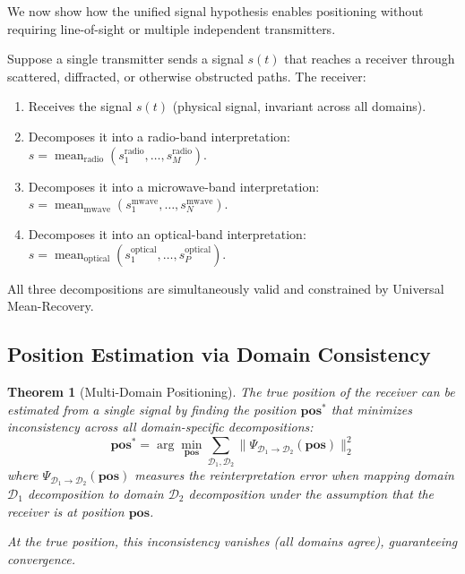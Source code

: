\documentclass[twocolumn,11pt,a4paper]{article}
\newtheorem{theorem}{Theorem}[section]
\newcommand{\signal}{s}
\newcommand{\domain}{\mathcal{D}}
\newcommand{\mean}{\operatorname{mean}}
\begin{document}
We now show how the unified signal hypothesis enables positioning without requiring line-of-sight or multiple independent transmitters.

\begin{setup}
Suppose a single transmitter sends a signal $\signal(t)$ that reaches a receiver through scattered, diffracted, or otherwise obstructed paths. The receiver:
\begin{enumerate}[nosep]
  \item Receives the signal $\signal(t)$ (physical signal, invariant across all domains).
  \item Decomposes it into a radio-band interpretation: $\signal = \mean_{\text{radio}}(\signal_1^{\text{radio}}, \ldots, \signal_M^{\text{radio}})$.
  \item Decomposes it into a microwave-band interpretation: $\signal = \mean_{\text{mwave}}(\signal_1^{\text{mwave}}, \ldots, \signal_N^{\text{mwave}})$.
  \item Decomposes it into an optical-band interpretation: $\signal = \mean_{\text{optical}}(\signal_1^{\text{optical}}, \ldots, \signal_P^{\text{optical}})$.
\end{enumerate}
All three decompositions are simultaneously valid and constrained by Universal Mean-Recovery.
\end{setup}

\subsection{Position Estimation via Domain Consistency}

\begin{theorem}[Multi-Domain Positioning]
The true position of the receiver can be estimated from a single signal by finding the position $\mathbf{pos}^*$ that minimizes inconsistency across all domain-specific decompositions:
\begin{equation}
  \mathbf{pos}^* = \arg\min_{\mathbf{pos}} \sum_{\domain_1, \domain_2} \| \Psi_{\domain_1 \to \domain_2}(\mathbf{pos}) \|_2^2
\end{equation}
where $\Psi_{\domain_1 \to \domain_2}(\mathbf{pos})$ measures the reinterpretation error when mapping domain $\domain_1$ decomposition to domain $\domain_2$ decomposition under the assumption that the receiver is at position $\mathbf{pos}$.

At the true position, this inconsistency vanishes (all domains agree), guaranteeing convergence.
\end{theorem}
\end{document}
